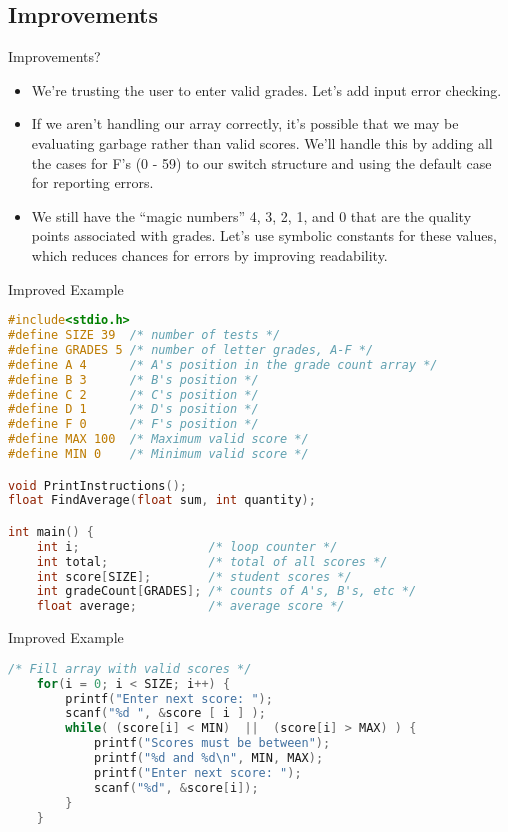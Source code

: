 \documentclass[graphics]{beamer}
\begin{document}
\subsection{Improvements}
\begin{frame}{Improvements?}
    \begin{itemize}
        \item We're trusting the user to enter valid grades. Let's add input error checking.
        \item If we aren't handling our array correctly, it's possible that we may be evaluating garbage rather than valid scores. We'll handle this by adding all the cases for F's (0 - 59) to our switch structure and using the default case for reporting errors.
        \item We still have the ``magic numbers'' 4, 3, 2, 1, and 0 that are the quality points associated with grades. Let's use symbolic constants for these values, which reduces chances for errors by improving readability.
    \end{itemize}
\end{frame}

\begin{frame}[fragile]{Improved Example}
    \begin{lstlisting}[language=C,basicstyle=\footnotesize,keywordstyle=\color{blue},commentstyle=\color{green},showstringspaces=false,stringstyle=\color{red}]
#include<stdio.h>
#define SIZE 39  /* number of tests */
#define GRADES 5 /* number of letter grades, A-F */
#define A 4      /* A's position in the grade count array */
#define B 3      /* B's position */
#define C 2      /* C's position */
#define D 1      /* D's position */
#define F 0      /* F's position */
#define MAX 100  /* Maximum valid score */
#define MIN 0    /* Minimum valid score */

void PrintInstructions();
float FindAverage(float sum, int quantity);

int main() {
    int i;                  /* loop counter */
    int total;              /* total of all scores */
    int score[SIZE];        /* student scores */
    int gradeCount[GRADES]; /* counts of A's, B's, etc */
    float average;          /* average score */
    \end{lstlisting}
\end{frame}

\begin{frame}[fragile]{Improved Example}
    \begin{lstlisting}[language=C,basicstyle=\footnotesize,keywordstyle=\color{blue},commentstyle=\color{green},showstringspaces=false,stringstyle=\color{red}]
    /* Fill array with valid scores */
    for(i = 0; i < SIZE; i++) {
        printf("Enter next score: ");
        scanf("%d ", &score [ i ] );
        while( (score[i] < MIN)  ||  (score[i] > MAX) ) {
            printf("Scores must be between");
            printf("%d and %d\n", MIN, MAX);
            printf("Enter next score: ");
            scanf("%d", &score[i]);
        }
    }
    \end{lstlisting}
\end{frame}
\end{document}
